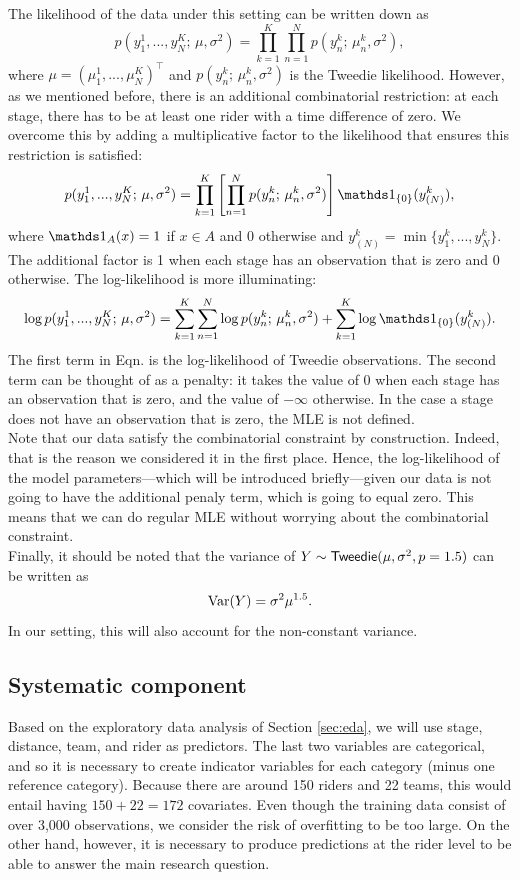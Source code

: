 \documentclass[aos,preprint]{imsart}
\begin{document}
The likelihood of the data under this setting can be written down as
\[
  p(y_1^1, ..., y_N^K; \, \mu, \sigma^2) = \prod_{k=1}^K \prod_{n=1}^N p(y_n^k; \, \mu_n^k, \sigma^2),
\]
where $\mu = (\mu_1^1, ..., \mu_N^K)^\top$ and $p(y_n^k; \, \mu_n^k, \sigma^2)$ is the Tweedie likelihood. However, as we mentioned before, there is an additional combinatorial restriction: at each stage, there has to be at least one rider with a time difference of zero. We overcome this by adding a multiplicative factor to the likelihood that ensures this restriction is satisfied:
\[
  p(y_1^1, ..., y_N^K; \, \mu, \sigma^2) = \prod_{k=1}^K \left[ \prod_{n=1}^N p(y_n^k; \, \mu_n^k, \sigma^2) \right] \ind_{\{ 0\}} (y_{(N)}^k),
\]
where $\ind_A(x) = 1$ if $x \in A$ and 0 otherwise and $y_{(N)}^k = \min \{y_1^k, ..., y_N^k \}$. The additional factor is 1 when each stage has an observation that is zero and 0 otherwise. The log-likelihood is more illuminating:
\[
  \log p(y_1^1, ..., y_N^K; \, \mu, \sigma^2) = \sum_{k=1}^K \sum_{n=1}^N \log p(y_n^k; \, \mu_n^k, \sigma^2) + \sum_{k=1}^K \log \ind_{\{ 0\}} (y_{(N)}^k). \label{eq:loglike}
\]
The first term in Eqn.  is the log-likelihood of \iid Tweedie observations. The second term can be thought of as a penalty: it takes the value of 0 when each stage has an observation that is zero, and the value of $-\infty$ otherwise. In the case a stage does not have an observation that is zero, the MLE is not defined. \\


Note that our data satisfy the combinatorial constraint by construction. Indeed, that is the reason we considered it in the first place. Hence, the log-likelihood of the model parameters---which will be introduced briefly---given our data is not going to have the additional penaly term, which is going to equal zero. This means that we can do regular MLE without worrying about the combinatorial constraint. \\


Finally, it should be noted that the variance of $Y \sim {\sf{Tweedie}}(\mu, \sigma^2, p = 1.5)$ can be written as
\[
  \operatorname{Var} (Y) = \sigma^2 \mu^{1.5}.
\]
In our setting, this will also account for the non-constant variance.


\subsection{Systematic component}


Based on the exploratory data analysis of Section \ref{sec:eda}, we will use stage, distance, team, and rider as predictors. The last two variables are categorical, and so it is necessary to create indicator variables for each category (minus one reference category). Because there are around 150 riders and 22 teams, this would entail having $150+22 = 172$ covariates. Even though the training data consist of over 3,000 observations, we consider the risk of overfitting to be too large. On the other hand, however, it is necessary to produce predictions at the rider level to be able to answer the main research question. \\
\end{document}
